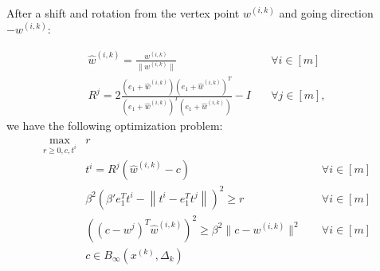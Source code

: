 \documentclass{article}
\newenvironment{comment}
  {\par\medskip
   \color{red}%
   \begin{framed}
   \textbf{Comment: }\ignorespaces}
 {\end{framed}
  \medskip}
\theoremstyle{case}
\numberwithin{theorem}{subsection}
\newcommand{\dk}{\Delta_k}
\newcommand{\tr}{{ B_{\infty}\left(\xk, \dk\right) }}
\newcommand{\wik}{{w^{(i, k)}}}
\newcommand{\xk}{x^{(k)}}
\begin{document}
After a shift and rotation from the vertex point $\wik$ and going direction $-\wik$:

\begin{align*}
\hat w^{(i,k)} = \frac {\wik} {\|\wik\|} & \quad \forall i \in [m] \\
R^j = 2 \frac{(e_1 + \hat w^{(i,k)})(e_1 + \hat w^{(i,k)})^T}{(e_1 + \hat w^{(i,k)})^T(e_1 + \hat w^{(i,k)})} - I  & \quad \forall j \in [m],
\end{align*}
we have the following optimization problem:
\begin{align*}
\begin{array} {ccc}
\max_{r \ge 0, c, t^i}	& r & \\
					& t^i = R^j\left(\hat w^{(i,k)} - c\right) 									& \quad \forall i \in [m] \\
					& \beta^2 \left(\beta' e_1^T t^i - \left\|t^i - e_1^T t^j\right\|\right)^2 \ge r			& \quad \forall i \in [m] \\
					& \left(\left(c - w^j\right)^T\hat w^{(i,k)}\right)^2 \ge \beta^2 \|c - \wik\|^2		& \quad \forall i \in [m] \\
					& c \in \tr &
\end{array}
\end{align*}

% 
% 
% 
% 
% 
% 
% 
\end{document}
